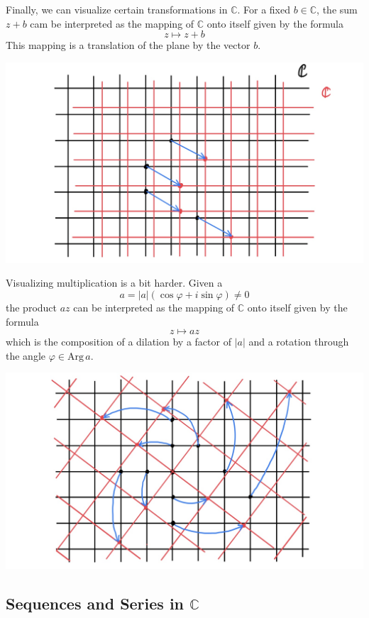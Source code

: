 \documentclass{article}
\begin{document}
  Finally, we can visualize certain transformations in $\mathbb{C}$. For a fixed $b \in \mathbb{C}$, the sum $z + b$ cam be interpreted as the mapping of $\mathbb{C}$ onto itself given by the formula 
  \[z \mapsto z + b\]
  This mapping is a translation of the plane by the vector $b$. 
  \begin{center}
      \includegraphics[scale=0.25]{img/Translation_in_Complex_Plane.jpg}
  \end{center}
  Visualizing multiplication is a bit harder. Given a 
  \[a = |a| (\cos{\varphi} + i \sin{\varphi}) \neq 0\]
  the product $az$ can be interpreted as the mapping of $\mathbb{C}$ onto itself given by the formula
  \[z \mapsto az\]
  which is the composition of a dilation by a factor of $|a|$ and a rotation through the angle $\varphi \in \text{Arg}\,a$. 
  \begin{center}
      \includegraphics[scale=0.3]{img/Multiplication_in_Complex_Plane.jpg}
  \end{center}

  \subsection[Sequences and Series in C]{Sequences and Series in $\mathbb{C}$}
\end{document}
